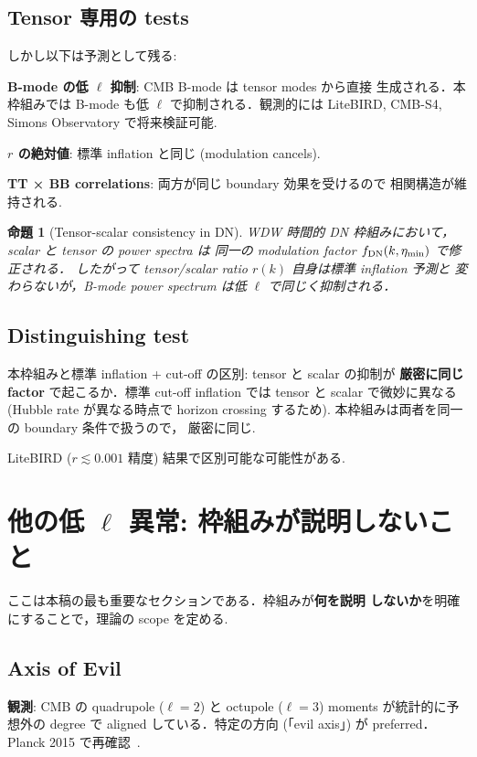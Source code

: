 \documentclass[11pt,a4paper]{article}
\newtheorem{proposition}{命題}
\begin{document}
\subsection{Tensor 専用の tests}

しかし以下は予測として残る:

\textbf{B-mode の低 $\ell$ 抑制}: CMB B-mode は tensor modes から直接
生成される．本枠組みでは B-mode も低 $\ell$ で抑制される．観測的には
LiteBIRD, CMB-S4, Simons Observatory で将来検証可能.

\textbf{$r$ の絶対値}: 標準 inflation と同じ (modulation cancels).

\textbf{TT × BB correlations}: 両方が同じ boundary 効果を受けるので
相関構造が維持される.

\begin{proposition}[Tensor-scalar consistency in DN]
WDW 時間的 DN 枠組みにおいて，scalar と tensor の power spectra は
同一の modulation factor $f_{\rm DN}(k,\eta_{\rm min})$ で修正される．
したがって tensor/scalar ratio $r(k)$ 自身は標準 inflation 予測と
変わらないが，B-mode power spectrum は低 $\ell$ で同じく抑制される．
\end{proposition}

\subsection{Distinguishing test}

本枠組みと標準 inflation + cut-off の区別: tensor と scalar の抑制が
\textbf{厳密に同じ factor} で起こるか．標準 cut-off inflation では
tensor と scalar で微妙に異なる (Hubble rate が異なる時点で horizon
crossing するため). 本枠組みは両者を同一の boundary 条件で扱うので，
厳密に同じ.

LiteBIRD ($r \lesssim 0.001$ 精度) 結果で区別可能な可能性がある.

\section{他の低 $\ell$ 異常: 枠組みが説明しないこと}

ここは本稿の最も重要なセクションである．枠組みが\textbf{何を説明
しないか}を明確にすることで，理論の scope を定める.

\subsection{Axis of Evil}

\textbf{観測}: CMB の quadrupole ($\ell = 2$) と octupole ($\ell = 3$)
moments が統計的に予想外の degree で aligned している．特定の方向
(「evil axis」) が preferred．Planck 2015 で再確認~\cite{Planck2015}.
\end{document}

